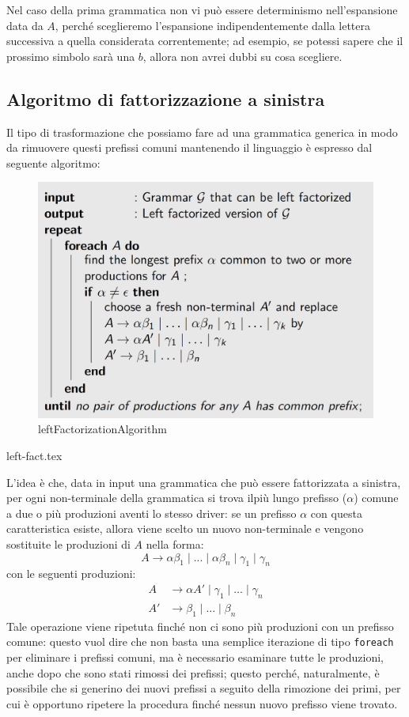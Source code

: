 \documentclass[class=book, crop=false, oneside, 12pt]{standalone}
\begin{document}
Nel caso della prima grammatica non vi può essere determinismo nell'espansione data da \(A\), perché sceglieremo l'espansione indipendentemente dalla lettera successiva a quella considerata correntemente; ad esempio, se potessi sapere che il prossimo simbolo sarà una \(b\), allora non avrei dubbi su cosa scegliere.

\subsection{Algoritmo di fattorizzazione a sinistra}
Il tipo di trasformazione che possiamo fare ad una grammatica generica in modo da rimuovere questi prefissi comuni mantenendo il linguaggio è espresso dal seguente algoritmo: 

\begin{figure}[H]
    \centering
    \includegraphics[width=.7\textwidth,keepaspectratio]{leftFactorizationAlgorithm.png}
    \caption{leftFactorizationAlgorithm}
    \label{leftFactorizationAlgorithm}
\end{figure}
{left-fact.tex}

L'idea è che, data in input una grammatica che può essere fattorizzata a sinistra, per ogni non-terminale della grammatica si trova ilpiù lungo prefisso (\(\alpha\)) comune a due o più produzioni aventi lo stesso driver: se un prefisso \(\alpha\) con questa caratteristica esiste, allora viene scelto un nuovo non-terminale e vengono sostituite le produzioni di \(A\) nella forma: 
\begin{equation*}
    A \rightarrow \alpha \beta_1 \mid ... \mid \alpha \beta_n \mid \gamma_1 \mid \gamma_n
\end{equation*}
con le seguenti produzioni: 
\begin{align*}
    A &\rightarrow \alpha A' \mid \gamma_1 \mid \ldots \mid \gamma_n \\
    A' &\rightarrow \beta_1 \mid \ldots \mid \beta_n
\end{align*}
Tale operazione viene ripetuta finché non ci sono più produzioni con un prefisso comune: questo vuol dire che non basta una semplice iterazione di tipo \texttt{foreach} per eliminare i prefissi comuni, ma è necessario esaminare tutte le produzioni, anche dopo che sono stati rimossi dei prefissi; questo perché, naturalmente, è possibile che si generino dei nuovi prefissi a seguito della rimozione dei primi, per cui è opportuno ripetere la procedura finché nessun nuovo prefisso viene trovato.
\end{document}
